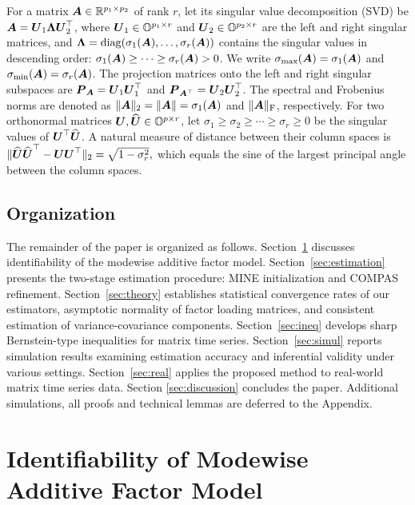 \documentclass[11pt,letterpaper]{article}
\theoremstyle{definition}
\begin{document}
For a matrix $\boldsymbol{A} \in \mathbb{R}^{p_1 \times p_2}$ of rank $r$, let its singular value decomposition (SVD) be $\boldsymbol{A} = \boldsymbol{U}_1 \boldsymbol{\Lambda} \boldsymbol{U}_2^{\top}$, where $\boldsymbol{U}_1 \in \mathbb{O}^{p_1 \times r}$ and $\boldsymbol{U}_2 \in \mathbb{O}^{p_2 \times r}$ are the left and right singular matrices, and $\boldsymbol{\Lambda} = {\rm diag}(\sigma_1(\boldsymbol{A}), \ldots, \sigma_r(\boldsymbol{A}))$ contains the singular values in descending order: $\sigma_1(\boldsymbol{A}) \ge \cdots \ge \sigma_r(\boldsymbol{A}) > 0$. We write $\sigma_{\max}(\boldsymbol{A}) = \sigma_1(\boldsymbol{A})$ and $\sigma_{\min}(\boldsymbol{A}) = \sigma_r(\boldsymbol{A})$. The projection matrices onto the left and right singular subspaces are $\boldsymbol{P}_{\boldsymbol{A}} = \boldsymbol{U}_1\boldsymbol{U}_1^{\top}$ and $\boldsymbol{P}_{\boldsymbol{A}^{\top}} = \boldsymbol{U}_2\boldsymbol{U}_2^{\top}$. The spectral and Frobenius norms are denoted as $\|\boldsymbol{A}\|_2=\|\boldsymbol{A}\|=\sigma_1(\boldsymbol{A})$ and $\|\boldsymbol{A}\|_{\mathrm{F}}$, respectively.
For two orthonormal matrices $\boldsymbol{U}, \widehat {\boldsymbol{U}} \in \mathbb{O}^{p \times r}$, let $\sigma_1\ge \sigma_2 \ge \cdots \ge \sigma_r\ge 0$ be the singular values of $\boldsymbol{U}^\top \widehat {\boldsymbol{U}}$. A natural measure of distance between their column spaces is
$\|\widehat {\boldsymbol{U}}\widehat {\boldsymbol{U}}^\top - \boldsymbol{U}\boldsymbol{U}^\top\|_2=\sqrt{1-\sigma_r^2},$
which equals the sine of the largest principal angle between the column spaces.





\subsection{Organization}
The remainder of the paper is organized as follows. Section~\ref{sec:model} discusses identifiability of the modewise additive factor model. Section~\ref{sec:estimation} presents the two-stage estimation procedure: MINE initialization and COMPAS refinement. Section~\ref{sec:theory} establishes statistical convergence rates of our estimators, asymptotic normality of factor loading matrices, and consistent estimation of variance-covariance components. 
Section~\ref{sec:ineq} develops sharp Bernstein-type inequalities for matrix time series. Section~\ref{sec:simul} reports simulation results examining estimation accuracy and inferential validity under various settings. Section~\ref{sec:real} applies the proposed method to real-world matrix time series data. Section \ref{sec:discussion} concludes the paper. Additional simulations, all proofs and technical lemmas are deferred to the Appendix.


\section{Identifiability of Modewise Additive Factor Model} \label{sec:model}
\end{document}
